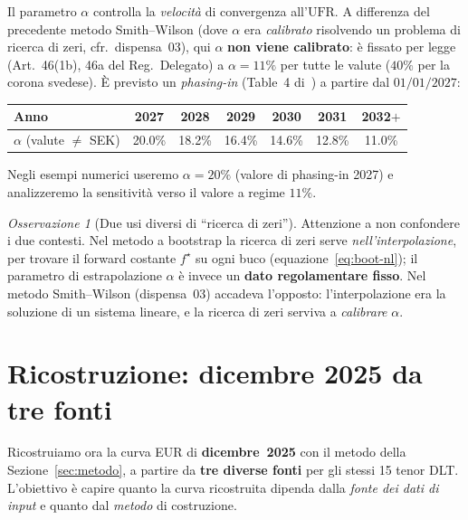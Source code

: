\documentclass[11pt,a4paper]{article}
\theoremstyle{plain}
\theoremstyle{definition}
\theoremstyle{remark}
\newtheorem*{osservazione}{Osservazione}
\newcommand{\UFR}{\mathrm{UFR}}
\begin{document}
Il parametro $\alpha$ controlla la \emph{velocit\`a} di convergenza all'$\UFR$. A differenza
del precedente metodo Smith--Wilson (dove $\alpha$ era \emph{calibrato} risolvendo un problema
di ricerca di zeri, cfr.\ dispensa~03), qui $\alpha$ \textbf{non viene calibrato}: \`e fissato
per legge (Art.~46(1b), 46a del Reg.~Delegato) a $\alpha=11\%$ per tutte le valute ($40\%$ per
la corona svedese). \`E previsto un \emph{phasing-in} (Table~4 di~\cite{eiopa2026}) a partire
dal $01/01/2027$:
\begin{center}\small
\renewcommand{\arraystretch}{1.15}
\begin{tabular}{lcccccc}
\toprule
Anno & 2027 & 2028 & 2029 & 2030 & 2031 & 2032$+$\\
\midrule
$\alpha$ (valute $\neq$ SEK) & 20.0\% & 18.2\% & 16.4\% & 14.6\% & 12.8\% & 11.0\%\\
\bottomrule
\end{tabular}
\end{center}
Negli esempi numerici useremo $\alpha=20\%$ (valore di phasing-in 2027) e analizzeremo la
sensitivit\`a verso il valore a regime $11\%$.

\begin{osservazione}[Due usi diversi di ``ricerca di zeri'']
Attenzione a non confondere i due contesti. Nel metodo a bootstrap la ricerca di zeri serve
\emph{nell'interpolazione}, per trovare il forward costante $f^\star$ su ogni buco
(equazione~\eqref{eq:boot-nl}); il parametro di estrapolazione $\alpha$ \`e invece un
\textbf{dato regolamentare fisso}. Nel metodo Smith--Wilson (dispensa~03) accadeva l'opposto:
l'interpolazione era la soluzione di un sistema lineare, e la ricerca di zeri serviva a
\emph{calibrare} $\alpha$.
\end{osservazione}

\section{Ricostruzione: dicembre 2025 da tre fonti}
\label{sec:ricostruzione}

Ricostruiamo ora la curva EUR di \textbf{dicembre~2025} con il metodo della
Sezione~\ref{sec:metodo}, a partire da \textbf{tre diverse fonti} per gli stessi 15 tenor DLT.
L'obiettivo \`e capire quanto la curva ricostruita dipenda dalla \emph{fonte dei dati di
input} e quanto dal \emph{metodo} di costruzione.
\end{document}
